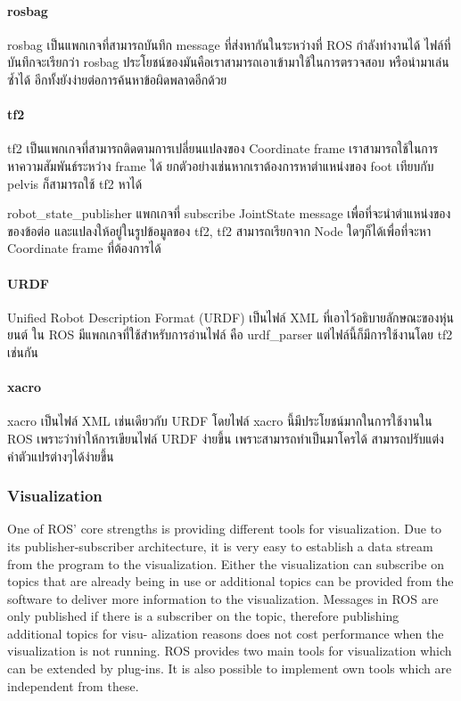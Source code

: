 \paragraph*{rosbag}
rosbag เป็นแพกเกจที่สามารถบันทึก message ที่ส่งหากันในระหว่างที่ ROS กำลังทำงานได้
ไฟล์ที่บันทึกจะเรียกว่า rosbag ประโยชน์ของมันคือเราสามารถเอาเข้ามาใช้ในการตรวจสอบ
หรือนำมาเล่นซ้ำได้ อีกทั้งยังง่ายต่อการค้นหาข้อผิดพลาดอีกด้วย

\paragraph*{tf2}
tf2 เป็นแพกเกจที่สามารถติดตามการเปลี่ยนแปลงของ Coordinate frame เราสามารถใช้ในการหาความสัมพันธ์ระหว่าง
frame ได้ ยกตัวอย่างเช่นหากเราต้องการหาตำแหน่งของ foot เทียบกับ pelvis ก็สามารถใช้ tf2 หาได้

robot\_state\_publisher แพกเกจที่ subscribe JointState message เพื่อที่จะนำตำแหน่งของของข้อต่อ
และแปลงให้อยู่ในรูปข้อมูลของ tf2, tf2 สามารถเรียกจาก Node ใดๆก็ได้เพื่อที่จะหา Coordinate frame ที่ต้องการได้

\paragraph*{URDF}
Unified Robot Description Format (URDF) เป็นไฟล์ XML ที่เอาไว้อธิบายลักษณะของหุ่นยนต์
ใน ROS มีแพกเกจที่ใช้สำหรับการอ่านไฟล์ คือ urdf\_parser แต่ไฟล์นี้ก็มีการใช้งานโดย tf2 เช่นกัน

\paragraph*{xacro}
xacro เป็นไฟล์ XML เช่นเดียวกับ URDF โดยไฟล์ xacro นี้มีประโยชน์มากในการใช้งานใน ROS เพราะว่าทำให้การเขียนไฟล์
URDF ง่ายขึ้น เพราะสามารถทำเป็นมาโครได้ สามารถปรับแต่งค่าตัวแปรต่างๆได้ง่ายขึ้น

\subsubsection*{Visualization}
One of ROS’ core strengths is providing different tools for visualization.  Due to its
publisher-subscriber architecture, it is very easy to establish a data stream from the
program to the visualization.  Either the visualization can subscribe on topics that
are already being in use or additional topics can be provided from the software to
deliver more information to the visualization.  Messages in ROS are only published
if there is a subscriber on the topic, therefore publishing additional topics for visu-
alization reasons does not cost performance when the visualization is not running.
ROS provides two main tools for visualization which can be extended by plug-ins.
It is also possible to implement own tools which are independent from these.


